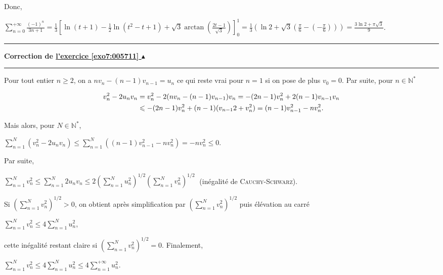 \documentclass[11pt,a4paper]{article}
\newcommand{\Nn}{\mathbb{N}} \newcommand{\N}{\mathbb{N}}
\newcommand{\Arctan}{\mathop{\mathrm{arctan}}\nolimits}
\newcounter{exo}
\newcommand{\correction}[1]{\hypertarget{cor7:#1}{}\label{cor7:#1}{\bf Correction de \hyperlink{exo7:#1}{l'exercice \ref{exo7:#1} $\blacktriangle$}}\vspace{1mm}\hrule\vspace{1mm}}
\newcommand{\fincorrection}{\vspace{1mm}\hrule\vspace*{7mm}}
\begin{document}
 
Donc, 

\begin{center}
$\sum_{n=0}^{+\infty}\frac{(-1)^n}{3n+1}=\frac{1}{3}\left[\ln(t+1)-\frac{1}{2}\ln(t^2-t+1)+\sqrt{3}\Arctan\left(\frac{2t-1}{\sqrt{3}}\right)\right]_0^1=\frac{1}{3}\left(\ln2+\sqrt{3}\left(\frac{\pi}{6}-\left(-\frac{\pi}{6}\right)\right)\right)=\frac{3\ln2+\pi\sqrt{3}}{9}$.
\end{center}

\begin{center}
\end{center}
\fincorrection
\correction{005711}
Pour tout entier $n\geqslant 2$, on a $nv_n-(n-1)v_{n-1}=u_n$ ce qui reste vrai pour $n = 1$ si on pose de plus $v_0 = 0$. Par suite, pour $n\in\Nn^*$

\begin{align*}\ensuremath
v_n^2 -2u_nv_n&=v_n^2 - 2(nv_n - (n-1)v_{n-1})v_n = -(2n-1) v_n^2 + 2(n-1)v_{n-1}v_n\\
 &\leqslant -(2n-1) v_n^2 +(n-1)(v_{n-1}2+v_n^2) =(n-1)v_{n-1}^2 - n v_n^2.
\end{align*}
	
        
Mais alors, pour $N\in\Nn^*$,

\begin{center}
$\sum_{n=1}^{N}(v_n^2 - 2u_nv_n)\leqslant\sum_{n=1}^{N}((n-1)v_{n-1}^2 - n v_n^2)= - nv_n^2\leqslant0$.
\end{center}

Par suite, 

\begin{center}
$\sum_{n=1}^{N}v_n^2\leqslant\sum_{n=1}^{N}2u_nv_n\leqslant2\left(\sum_{n=1}^{N}u_n^2\right)^{1/2}\left(\sum_{n=1}^{N}v_n^2\right)^{1/2}\;$ (inégalité de \textsc{Cauchy}-\textsc{Schwarz}).
\end{center}

Si $\left(\sum_{n=1}^{N}v_n^2\right)^{1/2}>0$, on obtient après simplification par $\left(\sum_{n=1}^{N}v_n^2\right)^{1/2}$ puis élévation au carré

\begin{center}
$\sum_{n=1}^{N}v_n^2\leqslant4\sum_{n=1}^{N}u_n^2$,
\end{center}

cette inégalité restant claire si $\left(\sum_{n=1}^{N}v_n^2\right)^{1/2}=0$. Finalement,

\begin{center}
$\sum_{n=1}^{N}v_n^2\leqslant4\sum_{n=1}^{N}u_n^2\leqslant4\sum_{n=1}^{+\infty}u_n^2$.
\end{center}
\end{document}
